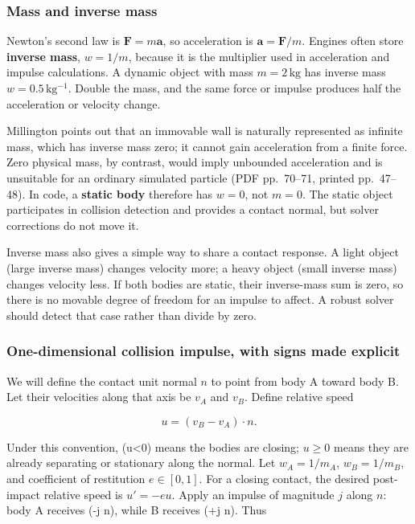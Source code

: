 \subsubsection{Mass and inverse mass}\label{06-engine-ii-ch033-mass-and-inverse-mass}

Newton's second law is \(\mathbf{F}=m\mathbf{a}\), so acceleration is \(\mathbf{a}=\mathbf{F}/m\). Engines often store \textbf{inverse mass}, \(w=1/m\), because it is the multiplier used in acceleration and impulse calculations. A dynamic object with mass \(m=2\,\mathrm{kg}\) has inverse mass \(w=0.5\,\mathrm{kg^{-1}}\). Double the mass, and the same force or impulse produces half the acceleration or velocity change.

Millington points out that an immovable wall is naturally represented as infinite mass, which has inverse mass zero; it cannot gain acceleration from a finite force. Zero physical mass, by contrast, would imply unbounded acceleration and is unsuitable for an ordinary simulated particle (PDF pp.~70--71, printed pp.~47--48). In code, a \textbf{static body} therefore has \(w=0\), not \(m=0\). The static object participates in collision detection and provides a contact normal, but solver corrections do not move it.

Inverse mass also gives a simple way to share a contact response. A light object (large inverse mass) changes velocity more; a heavy object (small inverse mass) changes velocity less. If both bodies are static, their inverse-mass sum is zero, so there is no movable degree of freedom for an impulse to affect. A robust solver should detect that case rather than divide by zero.

\subsubsection{One-dimensional collision impulse, with signs made explicit}\label{06-engine-ii-ch033-one-dimensional-collision-impulse-with-signs-made-explicit}

We will define the contact unit normal \(n\) to point from body A toward body B. Let their velocities along that axis be \(v_A\) and \(v_B\). Define relative speed

\[
u=(v_B-v_A)\cdot n.
\]

Under this convention, (u\textless0) means the bodies are closing; \(u\ge 0\) means they are already separating or stationary along the normal. Let \(w_A=1/m_A\), \(w_B=1/m_B\), and coefficient of restitution \(e\in[0,1]\). For a closing contact, the desired post-impact relative speed is \(u'=-e u\). Apply an impulse of magnitude \(j\) along \(n\): body A receives (-j n), while B receives (+j n). Thus

